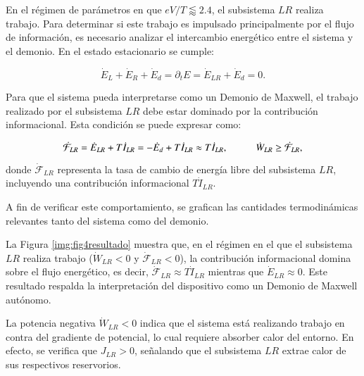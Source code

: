 
En el régimen de parámetros en que \( eV/T \lessapprox 2.4 \), el subsistema \( LR \) realiza trabajo. Para determinar si este trabajo es impulsado principalmente por el flujo de información, es necesario analizar el intercambio energético entre el sistema y el demonio. En el estado estacionario se cumple:

\[
\dot{E}_{L} + \dot{E}_{R} + \dot{E}_{d} = \partial_{t}E = \dot{E}_{LR} + \dot{E}_{d} = 0.
\]

Para que el sistema pueda interpretarse como un Demonio de Maxwell, el trabajo realizado por el subsistema \( LR \) debe estar dominado por la contribución informacional. Esta condición se puede expresar como:

\[
\dot{\mathcal{F}}_{LR} = \dot{E}_{LR} + T\dot{I}_{LR} = -\dot{E}_{d} + T\dot{I}_{LR} \approx T\dot{I}_{LR}, \hspace{10mm} \dot{W}_{LR} \geq \dot{\mathcal{F}}_{LR},
\]

donde \( \dot{\mathcal{F}}_{LR} \) representa la tasa de cambio de energía libre del subsistema \( LR \), incluyendo una contribución informacional \( T\dot{I}_{LR} \).

A fin de verificar este comportamiento, se grafican las cantidades termodinámicas relevantes tanto del sistema como del demonio.



La Figura \ref{img:fig4resultado} muestra que, en el régimen en el que el subsistema $LR$ realiza trabajo ($\dot{W}_{LR} < 0$ y $\dot{\mathcal{F}}_{LR} < 0$), la contribución informacional domina sobre el flujo energético, es decir, $\dot{\mathcal{F}}_{LR} \approx T \dot{I}_{LR}$ mientras que $\dot{E}_{LR} \approx 0$. Este resultado respalda la interpretación del dispositivo como un Demonio de Maxwell autónomo.

La potencia negativa $\dot{W}_{LR} < 0$ indica que el sistema está realizando trabajo en contra del gradiente de potencial, lo cual requiere absorber calor del entorno. En efecto, se verifica que $J_{LR} > 0$, señalando que el subsistema $LR$ extrae calor de sus respectivos reservorios.


